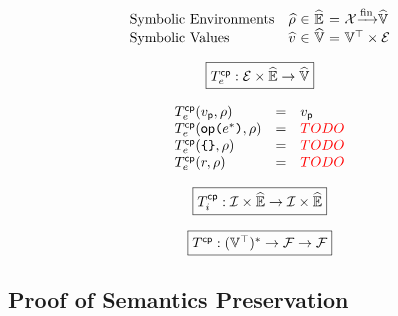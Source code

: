 \[
  \begin{array}{lr@{~}c@{~}l@{~}c@{~}l}
    \text{Symbolic Environments} & \senv &\in& \senvset &=&
    \varset \finmap \svalset\\
    \text{Symbolic Values} & \sval &\in& \svalset &=&
    \valoptset \times \exprset\\
  \end{array}
\]

\[
  \framebox{$\cptranse: \exprset \times \senvset \rightarrow \svalset$}
\]

\[
  \begin{array}{lcl}
    T^{\textsf{cp}}_e(v_{\textsf{p}}, \rho) &=& v_{\textsf{p}}\\
    T^{\textsf{cp}}_e(\textsf{op} \texttt{(} e^* \texttt{)}, \rho) &=& {\color{red}{TODO}}\\
    T^{\textsf{cp}}_e(\texttt{\{} \texttt{\}}, \rho) &=& {\color{red}{TODO}}\\
    T^{\textsf{cp}}_e(r, \rho) &=& {\color{red}{TODO}}\\
  \end{array}
\]

\[
  \framebox{$\cptransi: \instset \times \senvset \rightarrow \instset \times
  \senvset$}
\]

\todo

\[
  \framebox{$\cptrans: (\valoptset)^* \rightarrow \funcset \rightarrow
  \funcset$}
\]

\todo





% 
% 
% 
% 








\subsection{Proof of Semantics Preservation}

